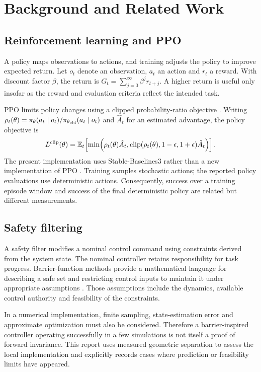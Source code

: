 \chapter{Background and Related Work}\label{ch:background}
\section{Reinforcement learning and PPO}
A policy maps observations to actions, and training adjusts the policy to improve expected return. Let $o_t$ denote an observation, $a_t$ an action and $r_t$ a reward. With discount factor $\beta$, the return is $G_t=\sum_{j=0}^{\infty}\beta^j r_{t+j}$. A higher return is useful only insofar as the reward and evaluation criteria reflect the intended task.

PPO limits policy changes using a clipped probability-ratio objective \parencite{schulman2017}. Writing $\rho_t(\theta)=\pi_\theta(a_t\mid o_t)/\pi_{\theta_{\rm old}}(a_t\mid o_t)$ and $\hat A_t$ for an estimated advantage, the policy objective is
\begin{equation}
L^{\rm clip}(\theta)=\mathbb{E}_t\!\left[\min\!\left(\rho_t(\theta)\hat A_t,
\operatorname{clip}(\rho_t(\theta),1-\epsilon,1+\epsilon)\hat A_t\right)\right].
\end{equation}
The present implementation uses Stable-Baselines3 rather than a new implementation of PPO \parencite{raffin2021}. Training samples stochastic actions; the reported policy evaluations use deterministic actions. Consequently, success over a training episode window and success of the final deterministic policy are related but different measurements.

\section{Safety filtering}
A safety filter modifies a nominal control command using constraints derived from the system state. The nominal controller retains responsibility for task progress. Barrier-function methods provide a mathematical language for describing a safe set and restricting control inputs to maintain it under appropriate assumptions \parencite{ames2017}. Those assumptions include the dynamics, available control authority and feasibility of the constraints.

In a numerical implementation, finite sampling, state-estimation error and approximate optimization must also be considered. Therefore a barrier-inspired controller operating successfully in a few simulations is not itself a proof of forward invariance. This report uses measured geometric separation to assess the local implementation and explicitly records cases where prediction or feasibility limits have appeared.


